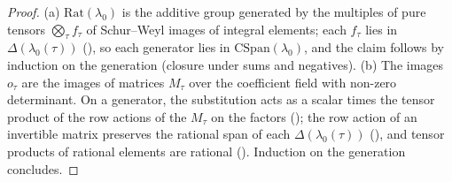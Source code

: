 \begin{proof}
(a) $\mathrm{Rat}(\lambda_0)$ is the additive group generated by the multiples of pure tensors $\bigotimes_\tau f_\tau$ of
Schur--Weyl images of integral elements; each $f_\tau$ lies in $\Delta(\lambda_0(\tau))$
(), so each generator lies in $\mathrm{CSpan}(\lambda_0)$, and the claim follows by
induction on the generation (closure under sums and negatives). (b) The images $o_\tau$ are the images of matrices $M_\tau$ over
the coefficient field with non-zero determinant. On a generator, the substitution acts as a scalar times the tensor product of
the row actions of the $M_\tau$ on the factors (); the row
action of an invertible matrix preserves the rational span of each $\Delta(\lambda_0(\tau))$
(), and tensor products of rational elements are rational
(). Induction on the generation concludes.
\end{proof}

